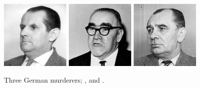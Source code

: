 \begin{figure}[htp]
    \centering
    \includegraphics[width=0.3\textwidth]{headshots/ok200by200.png}\hfill
    \includegraphics[width=0.3\textwidth]{headshots/je200by200.png}\hfill
    \includegraphics[width=0.3\textwidth]{headshots/jk200by200.png}
    \caption{Three German murderers; \OK, \JE \space and \JK.}
\end{figure}